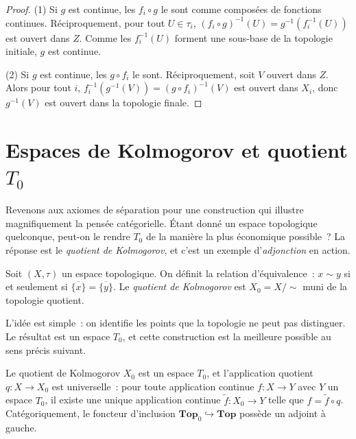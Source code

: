 \begin{proof}
(1) Si $g$ est continue, les $f_i \circ g$ le sont comme compos\'ees de fonctions continues.
R\'eciproquement, pour tout $U \in \tau_i$, $(f_i \circ g)^{-1}(U) = g^{-1}(f_i^{-1}(U))$
est ouvert dans $Z$. Comme les $f_i^{-1}(U)$ forment une sous-base de la topologie
initiale, $g$ est continue.

(2) Si $g$ est continue, les $g \circ f_i$ le sont. R\'eciproquement, soit $V$ ouvert dans
$Z$. Alors pour tout $i$, $f_i^{-1}(g^{-1}(V)) = (g \circ f_i)^{-1}(V)$ est ouvert dans
$X_i$, donc $g^{-1}(V)$ est ouvert dans la topologie finale.
\end{proof}

\section{Espaces de Kolmogorov et quotient $T_0$}

Revenons aux axiomes de s\'eparation pour une construction qui illustre
magnifiquement la pens\'ee cat\'egorielle. \'Etant donn\'e un espace topologique
quelconque, peut-on le \og rendre\fg{} $T_0$ de la mani\`ere la plus
\'economique possible~? La r\'eponse est le \emph{quotient de Kolmogorov}, et
c'est un exemple d'\emph{adjonction} en action.

\begin{definition}
Soit $(X,\tau)$ un espace topologique. On d\'efinit la relation d'\'equivalence~:
$x \sim y$ si et seulement si $\overline{\{x\}} = \overline{\{y\}}$. Le \emph{quotient
de Kolmogorov} est $X_0 = X / {\sim}$ muni de la topologie quotient.
\end{definition}

L'id\'ee est simple~: on identifie les points que la topologie ne peut pas
distinguer. Le r\'esultat est un espace $T_0$, et cette construction est
\og la meilleure possible\fg{} au sens pr\'ecis suivant.

\begin{theoreme}[R\'eflexion $T_0$]
Le quotient de Kolmogorov $X_0$ est un espace $T_0$, et l'application quotient
$q\colon X \to X_0$ est universelle~: pour toute application continue $f\colon X \to Y$
avec $Y$ un espace $T_0$, il existe une unique application continue
$\tilde{f}\colon X_0 \to Y$ telle que $f = \tilde{f} \circ q$.
Cat\'egoriquement, le foncteur d'inclusion $\mathbf{Top}_0 \hookrightarrow \mathbf{Top}$
poss\`ede un adjoint \`a gauche.
\end{theoreme}

